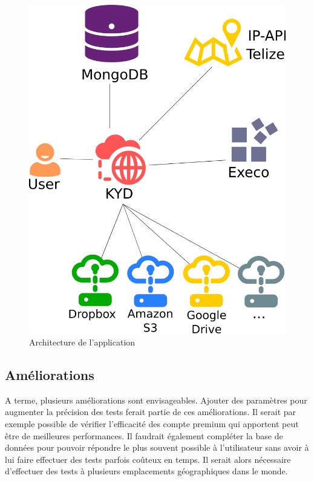 \documentclass[10pt]{article}
\begin{document}
\newpage

\begin{figure}[h]
\centering
\includegraphics[scale=0.5]{architecture.png}
\caption{Architecture de l'application}
\label{fig:Architecture de l'application}
\end{figure}

\subsection{Améliorations}

A terme, plusieurs améliorations sont envisageables. Ajouter des paramètres pour augmenter la précision des tests ferait partie de ces améliorations. Il serait par exemple possible de vérifier l'efficacité des compte premium qui apportent peut être de meilleures performances. Il faudrait également compléter la base de données pour pouvoir répondre le plus souvent possible à l'utilisateur sans avoir à lui faire effectuer des tests parfois coûteux en temps. Il serait alors nécessaire d'effectuer des tests à plusieurs emplacements géographiques dans le monde.\\
\end{document}
